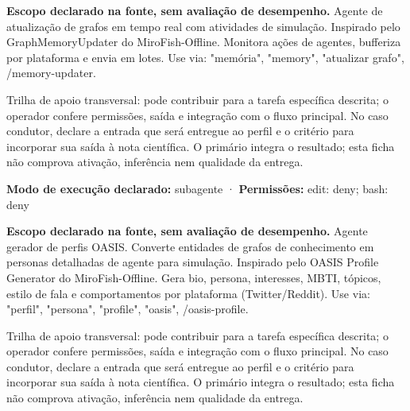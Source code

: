 \begin{descricao}
\textbf{Escopo declarado na fonte, sem avaliação de desempenho.}
Agente de atualização de grafos em tempo real com atividades de simulação. Inspirado pelo GraphMemoryUpdater do MiroFish-Offline. Monitora ações de agentes, bufferiza por plataforma e envia em lotes. Use via: "memória", "memory", "atualizar grafo", /memory-updater.
\end{descricao}

\begin{funcao}
Trilha de apoio transversal: pode contribuir para a tarefa específica descrita; o operador confere permissões, saída e integração com o fluxo principal. No caso condutor, declare a entrada que será entregue ao perfil e o critério para incorporar sua saída à nota científica. O primário integra o resultado; esta ficha não comprova ativação, inferência nem qualidade da entrega.
\end{funcao}

\begin{arquitetura}
\textbf{Modo de execução declarado:} subagente · \textbf{Permissões:} edit: deny; bash: deny
\end{arquitetura}


\begin{descricao}
\textbf{Escopo declarado na fonte, sem avaliação de desempenho.}
Agente gerador de perfis OASIS. Converte entidades de grafos de conhecimento em personas detalhadas de agente para simulação. Inspirado pelo OASIS Profile Generator do MiroFish-Offline. Gera bio, persona, interesses, MBTI, tópicos, estilo de fala e comportamentos por plataforma (Twitter/Reddit). Use via: "perfil", "persona", "profile", "oasis", /oasis-profile.
\end{descricao}

\begin{funcao}
Trilha de apoio transversal: pode contribuir para a tarefa específica descrita; o operador confere permissões, saída e integração com o fluxo principal. No caso condutor, declare a entrada que será entregue ao perfil e o critério para incorporar sua saída à nota científica. O primário integra o resultado; esta ficha não comprova ativação, inferência nem qualidade da entrega.
\end{funcao}

